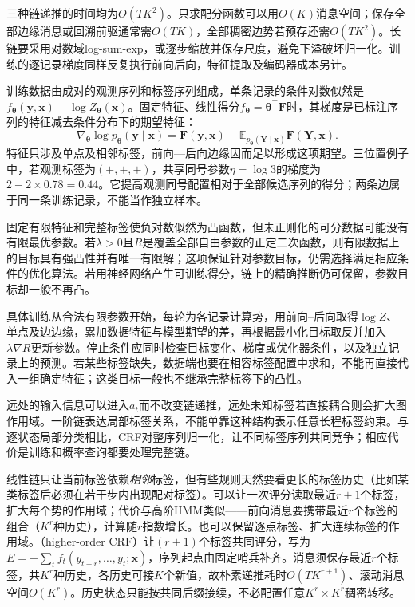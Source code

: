 三种链递推的时间均为$O(TK^2)$。只求配分函数可以用$O(K)$消息空间；保存全部边缘消息或回溯前驱通常需$O(TK)$，全部稠密边势若预存还需$O(TK^2)$。长链要采用对数域log-sum-exp，或逐步缩放并保存尺度，避免下溢破坏归一化。训练的逐记录梯度同样反复执行前向后向，特征提取及编码器成本另计。

训练数据由成对的观测序列和标签序列组成，单条记录的条件对数似然是$f_{\bm\theta}(\bm y,\bm x)-\log Z_{\bm\theta}(\bm x)$。固定特征、线性得分$f_{\bm\theta}=\bm\theta^\top\bm F$时，其梯度是已标注序列的特征减去条件分布下的期望特征：
\[
  \nabla_{\bm\theta}\log p_{\bm\theta}(\bm y\mid\bm x)
   =\bm F(\bm y,\bm x)
       -\mathbb E_{p_{\bm\theta}(\bm Y\mid\bm x)}
                      \bm F(\bm Y,\bm x).
\]
特征只涉及单点及相邻标签，前向—后向边缘因而足以形成这项期望。三位置例子中，若观测标签为$(+,+,+)$，共享同号参数$\eta=\log3$的梯度为$2-2\times0.78=0.44$。它提高观测同号配置相对于全部候选序列的得分；两条边属于同一条训练记录，不能当作独立样本。

固定有限特征和完整标签使负对数似然为凸函数，但未正则化的可分数据可能没有有限最优参数。若$\lambda>0$且$R$是覆盖全部自由参数的正定二次函数，则有限数据上的目标具有强凸性并有唯一有限解；这项保证针对参数目标，仍需选择满足相应条件的优化算法。若用神经网络产生可训练得分，链上的精确推断仍可保留，参数目标却一般不再凸。

具体训练从合法有限参数开始，每轮为各记录计算势，用前向--后向取得$\log Z$、单点及边边缘，累加数据特征与模型期望的差，再根据最小化目标取反并加入$\lambda\nabla R$更新参数。停止条件应同时检查目标变化、梯度或优化器条件，以及独立记录上的预测。若某些标签缺失，数据端也要在相容标签配置中求和，不能再直接代入一组确定特征；这类目标一般也不继承完整标签下的凸性。

远处的输入信息可以进入$a_t$而不改变链递推，远处未知标签若直接耦合则会扩大图作用域。一阶链表达局部标签关系，不能单靠这种结构表示任意长程标签约束。与逐状态局部分类相比，CRF对整序列归一化，让不同标签序列共同竞争；相应代价是训练和概率查询都要处理完整链。

线性链只让当前标签依赖\emph{相邻}标签，但有些规则天然要看更长的标签历史（比如某类标签后必须在若干步内出现配对标签）。可以让一次评分读取最近$r+1$个标签，扩大每个势的作用域；代价与高阶HMM类似——前向消息要携带最近$r$个标签的组合（$K^r$种历史），计算随$r$指数增长。也可以保留逐点标签、扩大连续标签的作用域。（higher-order CRF）让$(r+1)$个标签共同评分，写为$E=-\sum_t f_t(y_{t-r},\ldots,y_t;\bm{x})$，序列起点由固定哨兵补齐。消息须保存最近$r$个标签，共$K^r$种历史，各历史可接$K$个新值，故朴素递推耗时$O(TK^{r+1})$、滚动消息空间$O(K^r)$。历史状态只能按共同后缀接续，不必配置任意$K^r\times K^r$稠密转移。

